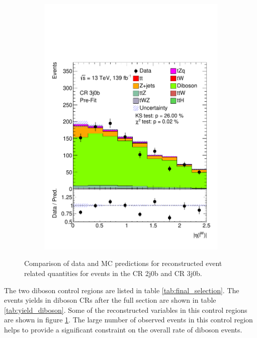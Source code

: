 \begin{figure}[h!]
\begin{subfigure}[b]{0.33\linewidth}
    \includegraphics[width=\linewidth]{ubonn-thesis/Chapters/Chapters_05/Figure/CR_VV/CR_3j0b_lepW_eta.pdf} 
  \end{subfigure} 
  \caption{Comparison of data and MC predictions for reconstructed event related quantities for events in the CR 2j0b and CR 3j0b. }
  \label{fig:CRdibson}
  \end{figure}


 
The two diboson control regions are listed in table \ref{tab:final_selection}. The events yields in diboson CRs after the full section are shown in table \ref{tab:yield_diboson}. Some of the reconstructed variables in this control regions are shown in figure \ref{fig:CRdibson}.
The large number of observed events in this control region helps to provide a significant constraint on the overall rate of diboson events.  



